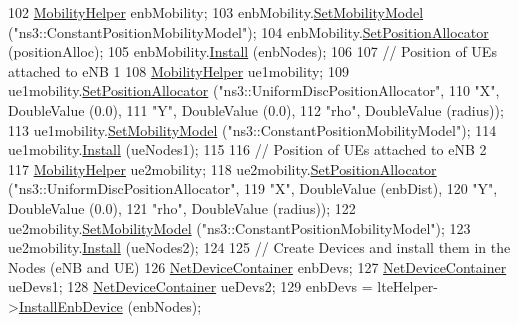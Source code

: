 \begin{DoxyCode}
102   \hyperlink{classns3_1_1MobilityHelper}{MobilityHelper} enbMobility;
103   enbMobility.\hyperlink{classns3_1_1MobilityHelper_a030275011b6f40682e70534d30280aba}{SetMobilityModel} (\textcolor{stringliteral}{"ns3::ConstantPositionMobilityModel"});
104   enbMobility.\hyperlink{classns3_1_1MobilityHelper_ac59d5295076be3cc11021566713a28c5}{SetPositionAllocator} (positionAlloc);
105   enbMobility.\hyperlink{classns3_1_1MobilityHelper_a07737960ee95c0777109cf2994dd97ae}{Install} (enbNodes);
106 
107   \textcolor{comment}{// Position of UEs attached to eNB 1}
108   \hyperlink{classns3_1_1MobilityHelper}{MobilityHelper} ue1mobility;
109   ue1mobility.\hyperlink{classns3_1_1MobilityHelper_ac59d5295076be3cc11021566713a28c5}{SetPositionAllocator} (\textcolor{stringliteral}{"ns3::UniformDiscPositionAllocator"},
110                                     \textcolor{stringliteral}{"X"}, DoubleValue (0.0),
111                                     \textcolor{stringliteral}{"Y"}, DoubleValue (0.0),
112                                     \textcolor{stringliteral}{"rho"}, DoubleValue (radius));
113   ue1mobility.\hyperlink{classns3_1_1MobilityHelper_a030275011b6f40682e70534d30280aba}{SetMobilityModel} (\textcolor{stringliteral}{"ns3::ConstantPositionMobilityModel"});
114   ue1mobility.\hyperlink{classns3_1_1MobilityHelper_a07737960ee95c0777109cf2994dd97ae}{Install} (ueNodes1);
115 
116   \textcolor{comment}{// Position of UEs attached to eNB 2}
117   \hyperlink{classns3_1_1MobilityHelper}{MobilityHelper} ue2mobility;
118   ue2mobility.\hyperlink{classns3_1_1MobilityHelper_ac59d5295076be3cc11021566713a28c5}{SetPositionAllocator} (\textcolor{stringliteral}{"ns3::UniformDiscPositionAllocator"},
119                                     \textcolor{stringliteral}{"X"}, DoubleValue (enbDist),
120                                     \textcolor{stringliteral}{"Y"}, DoubleValue (0.0),
121                                     \textcolor{stringliteral}{"rho"}, DoubleValue (radius));
122   ue2mobility.\hyperlink{classns3_1_1MobilityHelper_a030275011b6f40682e70534d30280aba}{SetMobilityModel} (\textcolor{stringliteral}{"ns3::ConstantPositionMobilityModel"});
123   ue2mobility.\hyperlink{classns3_1_1MobilityHelper_a07737960ee95c0777109cf2994dd97ae}{Install} (ueNodes2);
124 
125   \textcolor{comment}{// Create Devices and install them in the Nodes (eNB and UE)}
126   \hyperlink{classns3_1_1NetDeviceContainer}{NetDeviceContainer} enbDevs;
127   \hyperlink{classns3_1_1NetDeviceContainer}{NetDeviceContainer} ueDevs1;
128   \hyperlink{classns3_1_1NetDeviceContainer}{NetDeviceContainer} ueDevs2;
129   enbDevs = lteHelper->\hyperlink{classns3_1_1LteHelper_a5e009ad35ef85f46b5a6099263f15a03}{InstallEnbDevice} (enbNodes);

\end{DoxyCode}

